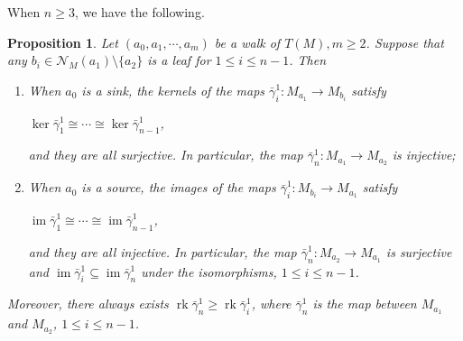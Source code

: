 \documentclass[a4paper,12pt]{amsart}
\newcommand{\bg}{\bar{\gamma}}
\DeclareMathOperator{\rk}{rk}
\DeclareMathOperator{\im}{im}
\newtheorem{proposition}{Proposition}[section]
\begin{document}
 When $n\geq 3$, we have the following.



\begin{proposition}\label{lj}
 Let $(a_0, a_1, \cdots, a_m)$ be a  walk of  $T(M), m\geq 2$. Suppose that any $b_i\in \mathcal{N}_M(a_1)\setminus \{a_2 \}$ is a leaf for $1 \leq i \leq n-1$. Then

\begin{enumerate}
\item  When  $a_0$ is a sink, the kernels of the maps $\bg^1_i: M_{a_1}\rightarrow M_{b_i}$  satisfy    
\begin{center}
 $\ker \bg^1_1\cong \cdots \cong  \ker \bg^1_{n-1}$, 
\end{center}
and they are all surjective. In particular,  the map $\bg^1_n: M_{a_1}\rightarrow M_{a_2}$ is injective;

\item   When $a_0$ is a source,  the images of the  maps $\bg^1_i: M_{b_i}\rightarrow M_{a_1}$  satisfy 
\begin{center}
$\im \bg^1_1\cong \cdots \cong\im \bg^{1}_{n-1}$,
\end{center}
 and they are all injective. In particular, the map $\bg^1_n: M_{a_2} \rightarrow M_{a_1}$ is surjective and $\im \bg^1_i\subseteq \im \bg^1_n$ under the isomorphisms, $1\leq i\leq n-1$.
\end{enumerate}
Moreover, there always exists $\rk \bg^1_n\geq  \rk \bg^1_i$,  where $\bg^1_n$ is the map between $M_{a_1}$ and $M_{a_2}$, $1\leq i\leq n-1$.

\end{proposition}
\end{document}
